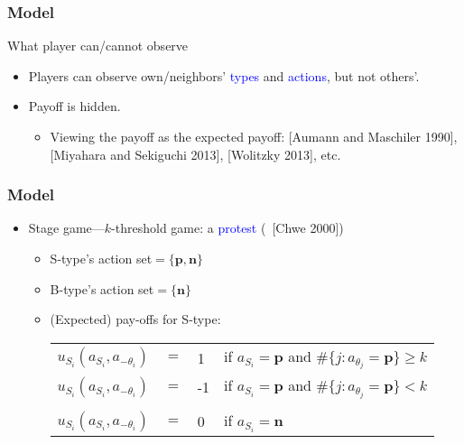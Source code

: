 \documentclass[10pt]{beamer}
\begin{document}
\begin{frame}
  \frametitle{Model}

What player can/cannot observe

\begin{itemize}
\item Players can observe own/neighbors' \textcolor{blue}{types} and \textcolor{blue}{actions}, but not others'.
\item Payoff is hidden.
\begin{itemize}
\item Viewing the payoff as the expected payoff: [Aumann and Maschiler 1990], [Miyahara and Sekiguchi 2013], [Wolitzky 2013], etc.
\end{itemize}
\end{itemize}




\end{frame}


\begin{frame}
  \frametitle{Model}

  \begin{itemize}

  \item Stage game---\alert{$k$}-threshold game: a \textcolor{blue}{protest} (~[Chwe 2000])




\begin{itemize}
\item S-type's action set$=\{\textbf{p},\textbf{n}\}$
\item B-type's action set$=\{\textbf{n}\}$
\item (Expected) pay-offs for S-type:
\begin{table}[h]
\begin{tabular}{llll}
$u_{S_i}(a_{S_i},a_{-\theta_i})$ & $=$ & 1 & if $a_{S_i}=\textbf{p}$ and $\#\{j:a_{\theta_j}=\textbf{p}\}\geq {k}$ \\
$u_{S_i}(a_{S_i},a_{-\theta_i})$ & $=$ & -1 & if $a_{S_i}=\textbf{p}$ and $\#\{j:a_{\theta_j}=\textbf{p}\}< {k}$ \\
\\
$u_{S_i}(a_{S_i},a_{-\theta_i})$ & $=$ & 0 & if $a_{S_i}=\textbf{n}$ 
\end{tabular}

\end{table}
\end{itemize}
  

 \end{itemize}

\end{frame}
\end{document}
